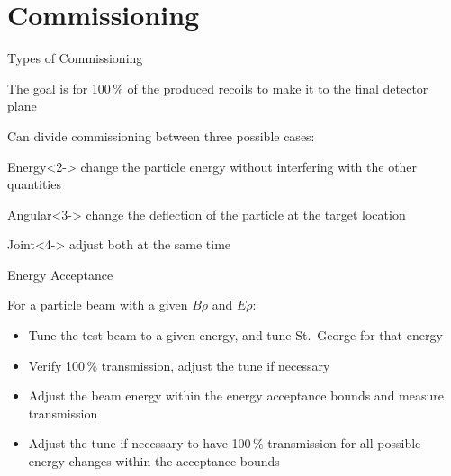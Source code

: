 \documentclass[10pt]{beamer}
\begin{document}
\section{Commissioning}

\begin{frame}[fragile]{Types of Commissioning}

    The goal is for 100\,\% of the produced recoils to make it to the
    final detector plane

    Can divide commissioning between three possible cases:

    \begin{alertblock}{Energy}<2->%
        change the particle energy without interfering with the other
        quantities
    \end{alertblock}
    \begin{alertblock}{Angular}<3->
        change the deflection of the particle at the target location
    \end{alertblock}
    \begin{alertblock}{Joint}<4->
        adjust both at the same time
    \end{alertblock}

\end{frame}





\begin{frame}[fragile]{Energy Acceptance}

    For a particle beam with a given $B\rho$ and $E\rho$:

    \begin{itemize}
        \item Tune the test beam to a given energy, and
            tune St.\ George for that energy
        \item Verify 100\,\% transmission, adjust the tune
            if necessary
        \item Adjust the beam energy within the energy
            acceptance bounds and measure transmission
        \item Adjust the tune if necessary to have 100\,\%
            transmission for all possible energy changes within the
            acceptance bounds
    \end{itemize}

\end{frame}
\end{document}
